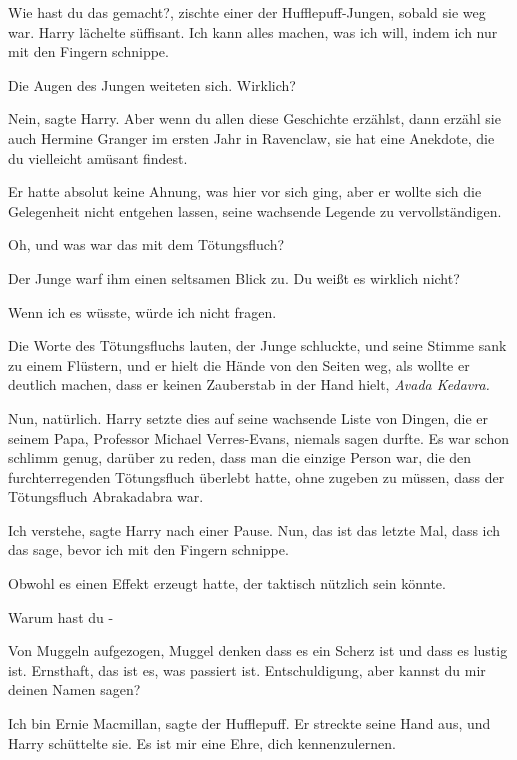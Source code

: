 \glqq{}Wie hast du das gemacht?\grqq{}, zischte einer der Hufflepuff-Jungen,
sobald sie weg war. Harry lächelte süffisant. \glqq{}Ich kann alles machen, was
ich will, indem ich nur mit den Fingern schnippe.\grqq{}

Die Augen des Jungen weiteten sich. \glqq{}Wirklich?\grqq{}

\glqq{}Nein\grqq{}, sagte Harry. \glqq{}Aber wenn du allen diese Geschichte
erzählst, dann erzähl sie auch Hermine Granger im ersten Jahr in Ravenclaw, sie
hat eine Anekdote, die du vielleicht amüsant findest.\grqq{}

Er hatte absolut keine Ahnung, was hier vor sich ging, aber er wollte sich die
Gelegenheit nicht entgehen lassen, seine wachsende Legende zu vervollständigen.

\glqq{}Oh, und was war das mit dem Tötungsfluch?\grqq{}

Der Junge warf ihm einen seltsamen Blick zu. \glqq{}Du weißt es wirklich
nicht?\grqq{}

\glqq{}Wenn ich es wüsste, würde ich nicht fragen.\grqq{}

\glqq{}Die Worte des Tötungsfluchs lauten\grqq{}, der Junge schluckte, und seine
Stimme sank zu einem Flüstern, und er hielt die Hände von den Seiten weg, als
wollte er deutlich machen, dass er keinen Zauberstab in der Hand hielt,
\emph{\glqq{}Avada Kedavra.\grqq{}}

Nun, natürlich. Harry setzte dies auf seine wachsende Liste von Dingen, die er
seinem Papa, Professor Michael Verres-Evans, niemals sagen durfte. Es war schon
schlimm genug, darüber zu reden, dass man die einzige Person war, die den
furchterregenden Tötungsfluch überlebt hatte, ohne zugeben zu müssen, dass der
Tötungsfluch \glqq{}Abrakadabra\grqq{} war.

\glqq{}Ich verstehe\grqq{}, sagte Harry nach einer Pause. \glqq{}Nun, das ist das
letzte Mal, dass ich das sage, bevor ich mit den Fingern schnippe.\grqq{}

Obwohl es einen Effekt erzeugt hatte, der taktisch nützlich sein könnte.

\glqq{}Warum hast du -\grqq{}

\glqq{}Von Muggeln aufgezogen, Muggel denken dass es ein Scherz ist und dass es
lustig ist. Ernsthaft, das ist es, was passiert ist. Entschuldigung, aber kannst
du mir deinen Namen sagen?\grqq{}

\glqq{}Ich bin Ernie Macmillan\grqq{}, sagte der Hufflepuff. Er streckte seine
Hand aus, und Harry schüttelte sie. \glqq{}Es ist mir eine Ehre, dich
kennenzulernen.\grqq{}

